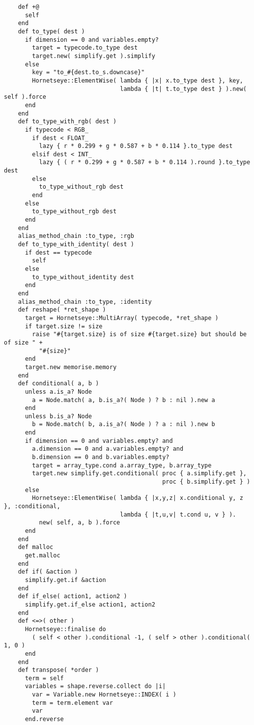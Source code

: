 \begin{lstlisting}
    def +@
      self
    end
    def to_type( dest )
      if dimension == 0 and variables.empty?
        target = typecode.to_type dest
        target.new( simplify.get ).simplify
      else
        key = "to_#{dest.to_s.downcase}"
        Hornetseye::ElementWise( lambda { |x| x.to_type dest }, key,
                                 lambda { |t| t.to_type dest } ).new( self ).force
      end
    end
    def to_type_with_rgb( dest )
      if typecode < RGB_
        if dest < FLOAT_
          lazy { r * 0.299 + g * 0.587 + b * 0.114 }.to_type dest
        elsif dest < INT_
          lazy { ( r * 0.299 + g * 0.587 + b * 0.114 ).round }.to_type dest
        else
          to_type_without_rgb dest
        end
      else
        to_type_without_rgb dest
      end
    end
    alias_method_chain :to_type, :rgb
    def to_type_with_identity( dest )
      if dest == typecode
        self
      else
        to_type_without_identity dest
      end
    end
    alias_method_chain :to_type, :identity
    def reshape( *ret_shape )
      target = Hornetseye::MultiArray( typecode, *ret_shape )
      if target.size != size
        raise "#{target.size} is of size #{target.size} but should be of size " +
          "#{size}"
      end
      target.new memorise.memory
    end
    def conditional( a, b )
      unless a.is_a? Node
        a = Node.match( a, b.is_a?( Node ) ? b : nil ).new a
      end
      unless b.is_a? Node
        b = Node.match( b, a.is_a?( Node ) ? a : nil ).new b
      end
      if dimension == 0 and variables.empty? and
        a.dimension == 0 and a.variables.empty? and
        b.dimension == 0 and b.variables.empty?
        target = array_type.cond a.array_type, b.array_type
        target.new simplify.get.conditional( proc { a.simplify.get },
                                             proc { b.simplify.get } )
      else
        Hornetseye::ElementWise( lambda { |x,y,z| x.conditional y, z }, :conditional,
                                 lambda { |t,u,v| t.cond u, v } ).
          new( self, a, b ).force
      end
    end
    def malloc
      get.malloc 
    end
    def if( &action )
      simplify.get.if &action
    end
    def if_else( action1, action2 )
      simplify.get.if_else action1, action2
    end
    def <=>( other )
      Hornetseye::finalise do
        ( self < other ).conditional -1, ( self > other ).conditional( 1, 0 )
      end
    end
    def transpose( *order )
      term = self
      variables = shape.reverse.collect do |i|
        var = Variable.new Hornetseye::INDEX( i )
        term = term.element var
        var
      end.reverse

\end{lstlisting}
